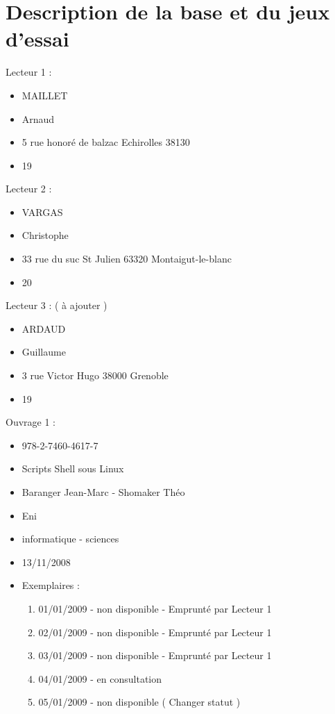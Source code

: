 \documentclass[a4paper,10pt]{report}
\begin{document}
\section*{Description de la base et du jeux d'essai}
\bigskip
\bigskip
\begin{flushleft}
Lecteur 1 :
\begin{itemize}
 \item MAILLET
 \item Arnaud
 \item 5 rue honoré de balzac Echirolles 38130
 \item 19
\end{itemize}
\bigskip
Lecteur 2 :
\begin{itemize}
 \item VARGAS
 \item Christophe
 \item 33 rue du suc St Julien 63320 Montaigut-le-blanc
 \item 20
\end{itemize}
\bigskip
Lecteur 3 : ( à ajouter )
\begin{itemize}
 \item ARDAUD
 \item Guillaume
 \item 3 rue Victor Hugo 38000 Grenoble
 \item 19
\end{itemize}
\bigskip
\bigskip
Ouvrage 1 : 
\begin{itemize}
 \item 978-2-7460-4617-7
 \item Scripts Shell sous Linux
 \item Baranger Jean-Marc - Shomaker Théo
 \item Eni
 \item informatique - sciences
 \item 13/11/2008
 \item Exemplaires :
	\begin{enumerate}
		\item 01/01/2009 - non disponible - Emprunté par Lecteur 1
		\item 02/01/2009 - non disponible - Emprunté par Lecteur 1
		\item 03/01/2009 - non disponible - Emprunté par Lecteur 1
		\item 04/01/2009 - en consultation
		\item 05/01/2009 - non disponible ( Changer statut )
	\end{enumerate}

\end{itemize}
\end{flushleft}
\end{document}
